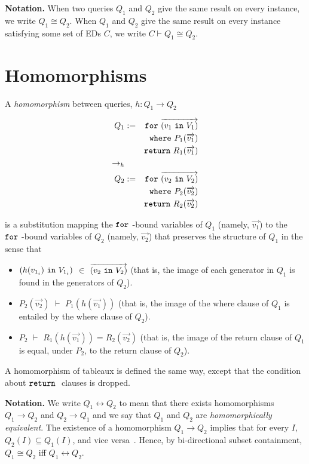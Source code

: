 \documentclass[preprint]{sigplanconf}
\newcommand{\FOR}{{\tt for} \ }
\newcommand{\WHERE}{{\tt where} \ }
\newcommand{\IN}{ \ {\tt in} \ }
\newcommand{\RETURN}{{\tt return} \ }
\begin{document}
{\bf Notation.}  When two queries $Q_1$ and $Q_2$ give the same result on every instance, we write $Q_1 \cong Q_2$.  When $Q_1$ and $Q_2$ give the same result on every instance satisfying some set of EDs $C$, we write $C \vdash Q_1 \cong Q_2$.

\section{Homomorphisms}

A {\it homomorphism} between queries, $h : Q_1 \to Q_2$ 
\begin{normalsize}
\begin{eqnarray*}
Q_1 & := & \FOR \overrightarrow{(v_1 \IN V_1)} \\
          & & \WHERE P_1(\overrightarrow{v_1}) \\
          & & \RETURN R_1(\overrightarrow{v_1}) \\
\to_h & & \\        
Q_2 & := & \FOR \overrightarrow{(v_2 \IN V_2)} \\
          & & \WHERE P_2(\overrightarrow{v_2}) \\
          & & \RETURN R_2(\overrightarrow{v_2})
\end{eqnarray*}
\end{normalsize}
is a substitution mapping the $\FOR$-bound variables of $Q_1$ (namely, $
\overrightarrow{v_1}$) to the $\FOR$-bound variables of $Q_2$ (namely, $
\overrightarrow{v_2}$) that preserves the structure of $Q_1$ in the sense that
\begin{itemize}
\item  
 $(h(v_{1_i}) \IN V_{1_i})$ $ \in$ $\overrightarrow{(v_2 \IN V_2)}$ (that is, the image of each generator in $Q_1$ is found in the generators of $Q_2$). 

\item $P_2(\overrightarrow{v_2})$ $\vdash$ $P_1(h(\overrightarrow{v_1}))$  (that is, the image of the where clause of $Q_1$ is entailed by the where clause of $Q_2$).

\item $P_2$ $\vdash$ $R_1(h(\overrightarrow{v_1})) = R_2(\overrightarrow{v_2})$ (that is, the image of the return clause of $Q_1$ is equal, under $P_2$, to the return clause of $Q_2$).
\end{itemize}
A homomorphism of tableaux is defined the same way, except that the condition about $\RETURN$ clauses is dropped.  

{\bf Notation.} We write $Q_1 \leftrightarrow Q_2$ to mean that there exists homomorphisms $Q_1 \to Q_2$ and $Q_2 \to Q_1$ and we say that $Q_1$ and $Q_2$ are {\it homomorphically equivalent}.  The existence of a homomorphism $Q_1 \to Q_2$ implies that for every $I$, $Q_2(I) \subseteq Q_1(I)$, and vice versa~\cite{foundations}.  Hence, by bi-directional subset containment, $Q_1 \cong Q_2$ iff $Q_1 \leftrightarrow Q_2$.
\end{document}
